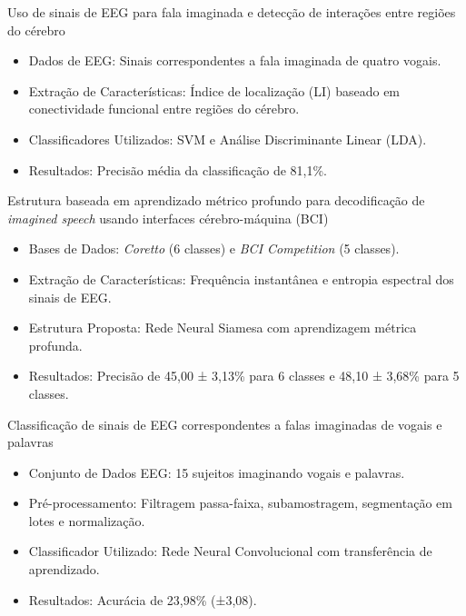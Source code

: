 \documentclass[aspectratio=169]{beamer}
\begin{document}
	\begin{frame}{Uso de sinais de EEG para fala imaginada e detecção de interações entre regiões do cérebro \cite{bakhshali2022investigating}}
		\begin{itemize}
			\item Dados de EEG: Sinais correspondentes a fala imaginada de quatro vogais.
			\item Extração de Características: Índice de localização (LI) baseado em conectividade funcional entre regiões do cérebro.
			\item Classificadores Utilizados: SVM e Análise Discriminante Linear (LDA).
			\item Resultados: Precisão média da classificação de 81,1\%.
		\end{itemize}
		
	\end{frame}
	
	\begin{frame}{Estrutura baseada em aprendizado métrico profundo para decodificação de \textit{imagined speech} usando interfaces cérebro-máquina (BCI) \cite{lee2021decoding}}
		\begin{itemize}
			\item Bases de Dados: \textit{Coretto} (6 classes) e \textit{BCI Competition} (5 classes).
			\item Extração de Características: Frequência instantânea e entropia espectral dos sinais de EEG.
			\item Estrutura Proposta: Rede Neural Siamesa com aprendizagem métrica profunda.
			\item Resultados: Precisão de 45,00 ± 3,13\% para 6 classes e 48,10 ± 3,68\% para 5 classes.
		\end{itemize}
		
	\end{frame}

	\begin{frame}{Classificação de sinais de EEG correspondentes a falas imaginadas de vogais e palavras \cite{tamm2020classification}}
		\begin{itemize}
			\item Conjunto de Dados EEG: 15 sujeitos imaginando vogais e palavras.
			\item Pré-processamento: Filtragem passa-faixa, subamostragem, segmentação em lotes e normalização.
			\item Classificador Utilizado: Rede Neural Convolucional com transferência de aprendizado.
			\item Resultados: Acurácia de 23,98\% (±3,08).
		\end{itemize}
		
	\end{frame}
	
\end{document}
